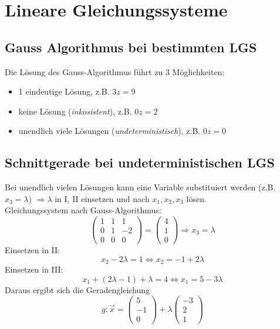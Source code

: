 
\section{Lineare Gleichungssysteme}
\label{sec:lineare_gleichungssysteme}

\subsection{Gauss Algorithmus bei bestimmten LGS}
\label{sub:gauss_algorithmus_bei_bestimmten_lgs}

Die Lösung des Gauss-Algorithmus führt zu 3 Möglichkeiten:

\begin{itemize}
	\item 1 eindeutige Lösung, z.B. $3z = 9$
	\item keine Lösung (\emph{inkosistent}), z.B. $0z = 2$
	\item unendlich viele Lösungen (\emph{undeterministisch}), z.B. $0z = 0$
\end{itemize}

\subsection{Schnittgerade bei undeterministischen LGS}
\label{sub:schnittgerade_bei_undeterministischen_lgs}

Bei unendlich vielen Lösungen kann eine Variable substituiert werden (z.B. $x_3 = \lambda$) $\Rightarrow \lambda$ 
in I, II einsetzen und nach $x_1, x_2, x_3$ lösen.\\
Gleichungssystem nach Gauss-Algorithmus:
\begin{displaymath}
	\left(\begin{matrix}
		1 & 1 & 1 \\ 0 & 1 & -2 \\ 0 & 0 & 0
	\end{matrix}\right)	
	= \left(\begin{matrix}
		4 \\ 1 \\ 0
	\end{matrix}\right) \Rightarrow x_3 = \lambda
\end{displaymath}
Einsetzen in II:
\begin{displaymath} x_2 - 2 \lambda = 1 \Leftrightarrow x_2 = -1 + 2 \lambda \end{displaymath}
Einsetzen in III:
\begin{displaymath} x_1 + (2\lambda -1) + \lambda = 4 \Leftrightarrow x_1 = 5 - 3\lambda \end{displaymath}
Daraus ergibt sich die Geradengleichung
\begin{displaymath}
	g: \overrightarrow{x} = \left(\begin{matrix}5\\-1\\0\end{matrix}\right) + \lambda
	\left(\begin{matrix}-3\\2\\1\end{matrix}\right)
\end{displaymath}
